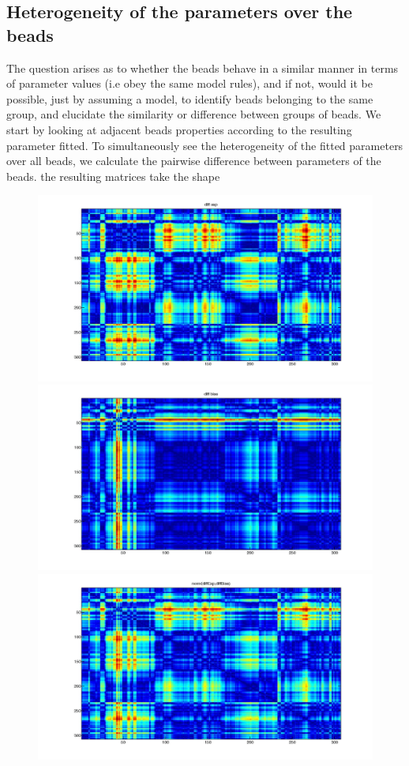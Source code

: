 \documentclass[12pt]{book}
\begin{document}
\subsection{Heterogeneity of the parameters over the beads}
The question arises as to whether the beads behave in a similar manner in terms of parameter values (i.e obey the same model rules), and if not, would it be possible, just by assuming a model, to identify beads belonging to the same group, and elucidate the similarity or difference between groups of beads. 
We start by looking at adjacent beads properties according to the resulting parameter fitted.
To simultaneously see the heterogeneity of the fitted parameters over all beads, we calculate the pairwise difference between parameters of the beads. 
the resulting matrices take the shape

\begin{figure}[H]
\includegraphics[scale=0.12]{diffFittedExpRep1}
\includegraphics[scale=0.12]{diffFittedBiasRep1}
\includegraphics[scale=0.12]{normDiffFittedExpfittedBiasRep1}

\end{figure}
\end{document}

